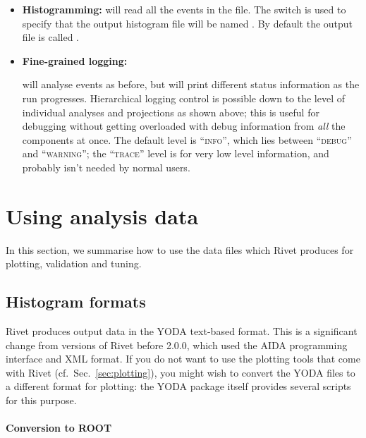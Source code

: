 \begin{itemize}
\item \textbf{Histogramming: }{ will read all the
    events in the  file. The  switch is used to
    specify that the output histogram file will be named . By
    default the output file is called .}

\item \textbf{Fine-grained logging: }

  {
    will analyse events as before, but will print different status
    information as the run progresses. Hierarchical logging control is possible
    down to the level of individual analyses and projections as shown above;
    this is useful for debugging without getting overloaded with debug
    information from \emph{all} the components at once. The default level is
    ``\textsc{info}'', which lies between ``\textsc{debug}'' and
    ``\textsc{warning}''; the ``\textsc{trace}'' level is for very low level
    information, and probably isn't needed by normal users.}

\end{itemize}



\section{Using analysis data}

In this section, we summarise how to use the data files which Rivet produces for
plotting, validation and tuning.

\subsection{Histogram formats}

Rivet produces output data in the YODA text-based format. This is a significant
change from versions of Rivet before 2.0.0, which used the AIDA programming
interface and XML format. If you do not want to use the plotting tools that come
with Rivet (cf.\ Sec.~\ref{sec:plotting}), you might wish to convert the YODA
files to a different format for plotting: the YODA package itself provides
several scripts for this purpose.

\paragraph{Conversion to ROOT}

